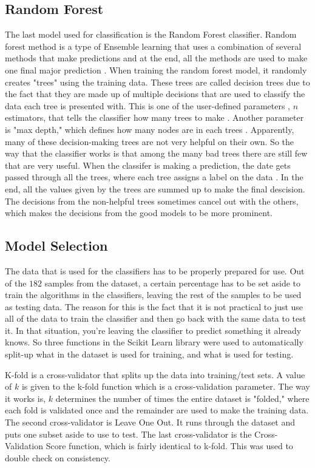 \documentclass[conference,compsoc]{IEEEtran}
\begin{document}
\subsection{Random Forest}
The last model used for classification is the Random Forest classifier. Random forest method is a type of Ensemble learning that uses a combination of several methods that make predictions and at the end, all the methods are used to make one final major prediction \cite{random}. When training the random forest model, it randomly creates "trees" using the training data. 
These trees are called decision trees due to the fact that they are made up of multiple decisions that are used to classify the data each tree is presented with. This is one of the user-defined parameters , $n$ estimators, that tells the classifier how many trees to make \cite{scikit}. Another parameter is "max depth," which defines how many nodes are in each trees \cite{scikit}. Apparently, many of these decision-making trees are not very helpful on their own. So the way that the classifier works is that among the many bad trees there are still few that are very useful. When the classifer is making a prediction, the date gets passed through all the trees, where each tree assigns a label on the data \cite{random}. In the end, all the values given by the trees are summed up to make the final descision. The decisions from the non-helpful trees sometimes cancel out with the others, which makes the decisions from the good models to be more prominent.

\subsection{Model Selection}
The data that is used for the classifiers has to be properly prepared for use. Out of the $182$ samples from the dataset, a certain percentage has to be set aside to train the algorithms in the classifiers, leaving the rest of the samples to be used as testing data. The reason for this is the fact that it is not practical to just use all of the data to train the classifier and then go back with the same data to test it. In that situation, you're leaving the classifier to predict something it already knows. 
So three functions in the Scikit Learn library were used to automatically split-up what in the dataset is used for training, and what is used for testing. 

K-fold is a cross-validator that splits up the data into training/test sets. A value of $k$ is given to the k-fold function which is a cross-validation parameter. The way it works is, $k$ determines the number of times the entire dataset is "folded," where each fold is validated once and the remainder are used to make the training data. 
The second cross-validator is Leave One Out. It runs through the dataset and puts one subset aside to use to test. The last cross-validator is the Cross-Validation Score function, which is fairly identical to k-fold. This was used to double check on consistency.
\end{document}
